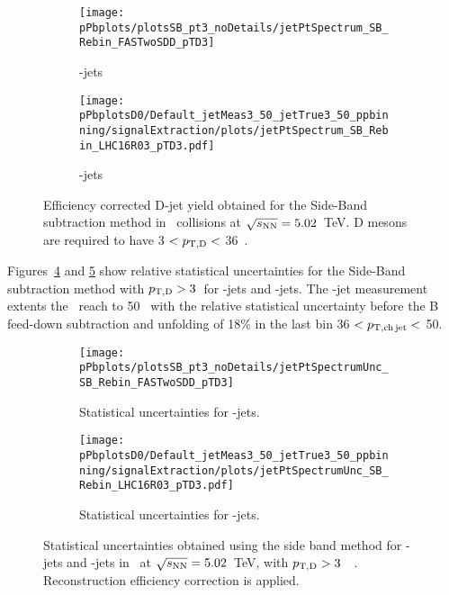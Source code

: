 \begin{figure}[bth]
\centering
\begin{subfigure}[b]{0.45\textwidth}
\texttt{[image: pPbplots/plotsSB\_pt3\_noDetails/jetPtSpectrum\_SB\_Rebin\_FASTwoSDD\_pTD3]}
\label{fig:eq_pPb_Directjet_corrSum_Dstar}
\caption{\Dstar-jets}
\end{subfigure}
\begin{subfigure}[b]{0.45\textwidth}
\texttt{[image: pPbplotsD0/Default\_jetMeas3\_50\_jetTrue3\_50\_ppbinning/signalExtraction/plots/jetPtSpectrum\_SB\_Rebin\_LHC16R03\_pTD3.pdf]}
\caption{\Dzero-jets}
\label{fig:eq_pPb_Directjet_corrSum_Dzero}
\end{subfigure}
\caption{Efficiency corrected D-jet yield obtained for the Side-Band subtraction method in \pPb\ collisions at $\sqrt{s_{\rm NN}}=5.02$~TeV. D mesons are required to have 3 $< p_{\mathrm{T,D}}<$ 36~\GeVc.}
\label{fig:eq_pPb_Directjet_corrSum_reb}
\end{figure}

Figures~\ref{fig:JetPt_pPb_SBUnc_Dstar} and \ref{fig:JetPt_pPb_SBUnc_Dzero} show relative statistical uncertainties for the Side-Band subtraction method with $p_{\mathrm{T,D}}>3$~\GeVc for \Dstar-jets and \Dzero-jets. The \Dzero-jet measurement extents the \ptchjet\ reach to 50 \GeVc\, with the relative statistical uncertainty before the B feed-down subtraction and unfolding of 18\% in the last bin 36 $< p_{\mathrm{T,ch\, jet}} <$ 50.

\begin{figure}[bth]
\centering
\begin{subfigure}[b]{0.45\textwidth}
\texttt{[image: pPbplots/plotsSB\_pt3\_noDetails/jetPtSpectrumUnc\_SB\_Rebin\_FASTwoSDD\_pTD3]}
\caption{Statistical uncertainties for \Dstar-jets.}
\label{fig:JetPt_pPb_SBUnc_Dstar}
\end{subfigure}
\begin{subfigure}[b]{0.45\textwidth}
\texttt{[image: pPbplotsD0/Default\_jetMeas3\_50\_jetTrue3\_50\_ppbinning/signalExtraction/plots/jetPtSpectrumUnc\_SB\_Rebin\_LHC16R03\_pTD3.pdf]}
\caption{Statistical uncertainties for \Dzero-jets.}
\label{fig:JetPt_pPb_SBUnc_Dzero}
\end{subfigure}
\caption{Statistical uncertainties obtained using the side band method for \Dstar-jets and \Dzero-jets in \pPb\ at $\sqrt{s_{\rm NN}}=5.02$~TeV, with $p_{\mathrm{T,D}}>3$~\GeVc\ . Reconstruction efficiency correction is applied.}
\label{fig:JetPt_pPb_SBUnc_D}
\end{figure}


